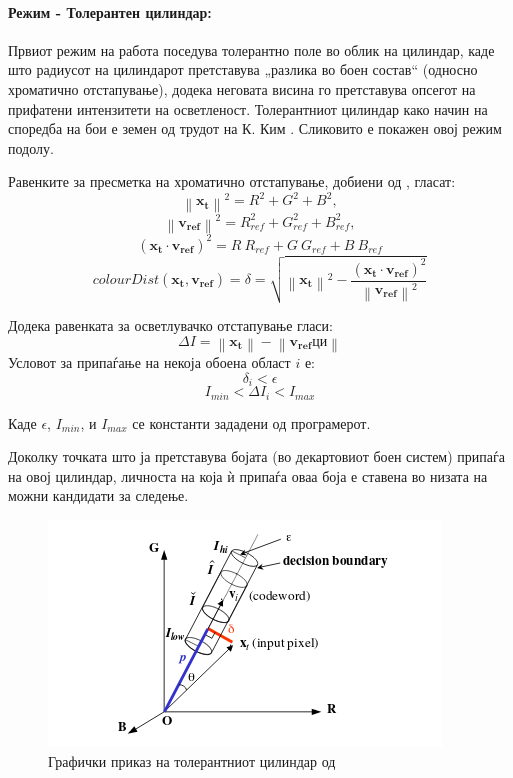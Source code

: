 \documentclass[11pt]{article}
\newcommand\norm[1]{\left\lVert#1\right\rVert}
\renewcommand{\vec}[1]{\mathbf{#1}}
\begin{document}
      \paragraph{Режим - Толерантен цилиндар:\\}
        Првиот режим на работа поседува толерантно поле во облик на цилиндар, каде што радиусот на цилиндарот претставува „разлика во боен состав“ (односно хроматично отстапување), додека неговата висина го претставува опсегот на прифатени интензитети на осветленост. Толерантниот цилиндар како начин на споредба на бои е земен од трудот на К. Ким \cite{kim}. Сликовито е покажен овој режим подолу.

        Равенките за пресметка на хроматично отстапување, добиени од \cite{kim}, гласат:
        $$  \norm{\vec{x_t}}^2 = R^2 + G^2 + B^2,$$
        $$  \norm{\vec{v_{ref}}}^2 = R_{ref}^2 + G_{ref}^2 + B_{ref}^2, $$
        $$    (\vec{x_t} \cdot \vec{v_{ref}})^2 = R\ R_{ref} + G\ G_{ref} + B\ B_{ref} $$
        $$    colourDist(\vec{x_t}, \vec{v_{ref}}) = \delta = \sqrt{\norm{\vec{x_t}}^2 - \frac{(\vec{x_t} \cdot \vec{v_{ref}})^2}{\norm{\vec{v_{ref}}}^2}} $$
        \bigbreak

        Додека равенката за осветлувачко отстапување гласи:
        $$ \Delta I = \norm{\vec{x_t}} - \norm{\vec{v_{ref}} ци} $$
        \bigbreak
        Условот за припаѓање на некоја обоена област $i$ е:
        $$ \delta_{i} < \epsilon $$
        $$ I_{min}< \Delta I_i < I_{max} $$

        Каде $\epsilon$, $I_{min}$, и $I_{max}$ се константи зададени од програмерот.

        Доколку точката што ја претставува бојата (во декартовиот боен систем) припаѓа на овој цилиндар, личноста на која ѝ припаѓа оваа боја е ставена во низата на можни кандидати за следење.
        \begin{figure}[H]
          \centering
          \includegraphics[width = 0.6\linewidth]{./images/cylinder.png}
          \caption{Графички приказ на толерантниот цилиндар од \cite{kim}}
          \label{fig:cylinder}
        \end{figure}
\end{document}
